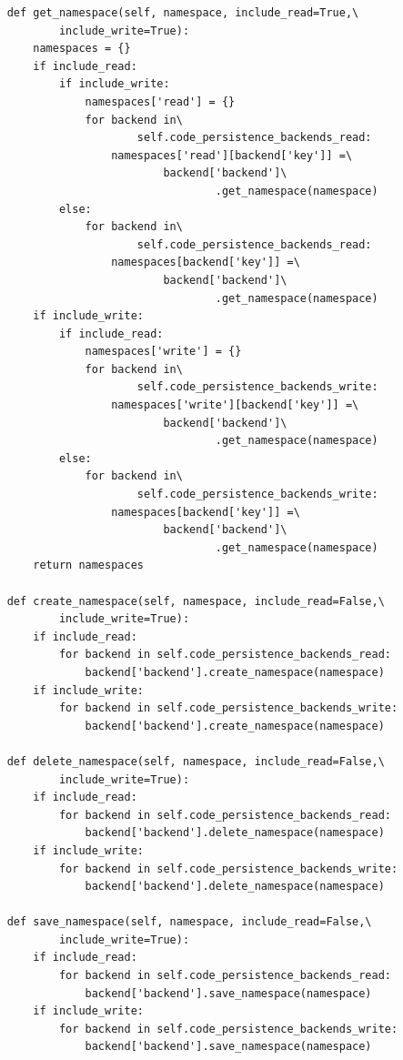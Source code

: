 \begin{lstlisting}
    def get_namespace(self, namespace, include_read=True,\
            include_write=True):
        namespaces = {}
        if include_read:
            if include_write:
                namespaces['read'] = {}
                for backend in\
                        self.code_persistence_backends_read:
                    namespaces['read'][backend['key']] =\
                            backend['backend']\
                                    .get_namespace(namespace)
            else:
                for backend in\
                        self.code_persistence_backends_read:
                    namespaces[backend['key']] =\
                            backend['backend']\
                                    .get_namespace(namespace)
        if include_write:
            if include_read:
                namespaces['write'] = {}
                for backend in\
                        self.code_persistence_backends_write:
                    namespaces['write'][backend['key']] =\
                            backend['backend']\
                                    .get_namespace(namespace)
            else:
                for backend in\
                        self.code_persistence_backends_write:
                    namespaces[backend['key']] =\
                            backend['backend']\
                                    .get_namespace(namespace)
        return namespaces

    def create_namespace(self, namespace, include_read=False,\
            include_write=True):
        if include_read:
            for backend in self.code_persistence_backends_read:
                backend['backend'].create_namespace(namespace)
        if include_write:
            for backend in self.code_persistence_backends_write:
                backend['backend'].create_namespace(namespace)

    def delete_namespace(self, namespace, include_read=False,\
            include_write=True):
        if include_read:
            for backend in self.code_persistence_backends_read:
                backend['backend'].delete_namespace(namespace)
        if include_write:
            for backend in self.code_persistence_backends_write:
                backend['backend'].delete_namespace(namespace)

    def save_namespace(self, namespace, include_read=False,\
            include_write=True):
        if include_read:
            for backend in self.code_persistence_backends_read:
                backend['backend'].save_namespace(namespace)
        if include_write:
            for backend in self.code_persistence_backends_write:
                backend['backend'].save_namespace(namespace)


\end{lstlisting}
